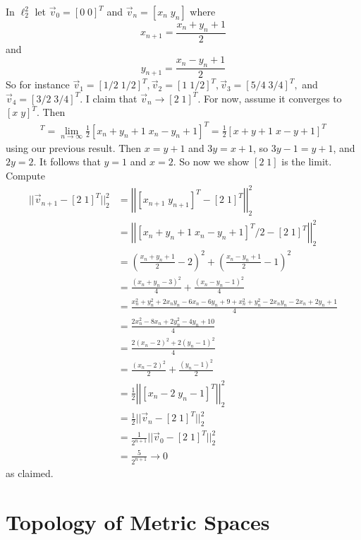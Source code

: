 \begin{eg}
    In $\ell_2^2$ let $\vec{v}_0 = [0\;0]^T$ and $\vec{v}_n = [x_n\;y_n]$ where $$x_{n+1} = \frac{x_n+y_n+1}{2}$$ and $$y_{n+1} = \frac{x_n - y_n+1}{2}$$ So for instance $\vec{v}_1 = [1/2\;1/2]^T,\vec{v}_2 = [1\;1/2]^T,\vec{v}_3 = [5/4\;3/4]^T,$ and $\vec{v}_4 = [3/2\;3/4]^T$. I claim that $\vec{v}_n\rightarrow [2\;1]^T$. For now, assume it converges to $[x\;y]^T$. Then \begin{align*}
        [x\;y]^T = \lim\limits_{n\rightarrow \infty}\frac{1}{2}[x_n+y_n+1\;x_n-y_n+1]^T = \frac{1}{2}[x+y+1\;x-y+1]^T
    \end{align*}
    using our previous result. Then $x = y+1$ and $3y = x+1$, so $3y-1=y+1$, and $2y = 2$. It follows that $y = 1$ and $x = 2$. So now we show $[2\;1]$ is the limit. Compute \begin{align*}
        ||\vec{v}_{n+1} - [2\;1]^T||_2^2 &= \left|\left|[x_{n+1}\;y_{n+1}]^T - [2\;1]^T\right|\right|_2^2 \\
        &= \left|\left|[x_{n}+y_n+1\;x_n -y_{n}+1]^T/2 - [2\;1]^T\right|\right|_2^2 \\
        &= \left(\frac{x_n+y_n+1}{2}-2\right)^2 + \left(\frac{x_n-y_n+1}{2}-1\right)^2 \\
        &=\frac{(x_n+y_n-3)^2}{4} + \frac{(x_n-y_n-1)^2}{4} \\
        &= \frac{x_n^2+y_n^2+2x_ny_n-6x_n-6y_n+9+x_n^2+y_n^2-2x_ny_n-2x_n+2y_n+1}{4} \\
        &= \frac{2x_n^2-8x_n+2y_n^2-4y_n+10}{4} \\
        &= \frac{2(x_n-2)^2+2(y_n-1)^2}{4} \\
        &= \frac{(x_n-2)^2}{2} + \frac{(y_n-1)^2}{2} \\
        &= \frac{1}{2}\left|\left|[x_n-2\;y_n-1]^T\right|\right|_2^2 \\
        &= \frac{1}{2}||\vec{v}_n - [2\;1]^T||_2^2 \tag{iterate this argument} \\
        &= \frac{1}{2^{n+1}}||\vec{v}_0 - [2\;1]^T||_2^2 \\
        &=\frac{5}{2^{n+1}}\rightarrow 0
    \end{align*}
    as claimed.
\end{eg}


\section{Topology of Metric Spaces}


